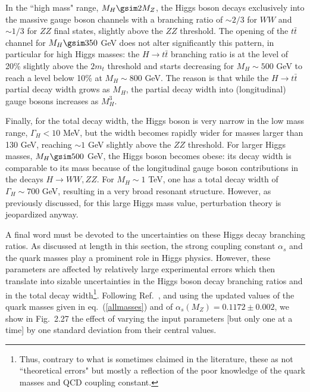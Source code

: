 \newpage

In the ``high mass" range, $M_H \gsim 2M_Z$, the Higgs boson decays exclusively
into the massive gauge boson channels with a branching ratio of $\sim 2/3$ for
$WW$ and $\sim 1/3$ for $ZZ$ final states, slightly above the $ZZ$ threshold. 
The opening of the $t\bar{t}$ channel for $M_H \gsim 350$ GeV does not alter
significantly this pattern, in particular for high Higgs masses: the $H \to
t\bar{t}$ branching ratio is at the level of 20\% slightly above the $2m_t$
threshold and starts decreasing for $M_H \sim 500$ GeV to reach a level
below 10\% at $M_H \sim 800$ GeV.  The reason is that while the $H \to
t\bar{t}$ partial decay width grows as $M_H$, the partial decay width
into (longitudinal) gauge bosons increases as $M_H^3$. \s

Finally, for the total decay width, the Higgs boson is very narrow in the low
mass range, $\Gamma_{H} <10$ MeV, but the width becomes rapidly wider for
masses larger than 130 GeV, reaching $\sim 1$ GeV slightly above the $ZZ$
threshold. For larger Higgs masses,  $M_{H} \gsim 500$ GeV, the Higgs boson
becomes obese: its decay width is comparable to its mass because of the
longitudinal gauge boson contributions in the decays $H \to WW,ZZ$. For $M_H
\sim 1$ TeV, one has a total decay width of $\Gamma_H \sim 700$ GeV, resulting 
in a very broad resonant structure.  However, as previously discussed, for this
large Higgs mass value, perturbation theory is jeopardized anyway.\s

A final word must be devoted to the uncertainties on these Higgs decay
branching ratios. As discussed at length in this section, the strong coupling
constant $\alpha_s$ and the quark masses play a prominent role in Higgs
physics. However, these parameters are affected by relatively large experimental
errors which then translate into sizable uncertainties in the Higgs boson
decay branching ratios and in the total decay width\footnote{Thus, contrary to
what is sometimes claimed in the literature, these as not ``theoretical errors"
but mostly a reflection of the poor knowledge of the quark masses and QCD
coupling constant.}. Following Ref.~\cite{DSZ}, and using the updated values of
the quark masses given in eq.~(\ref{allmasses}) and of $\alpha_s (M_Z)=0.1172
\pm 0.002$, we show in Fig.~2.27 the effect of varying the input parameters
[but only one at a time] by one standard deviation from their central values.\s


